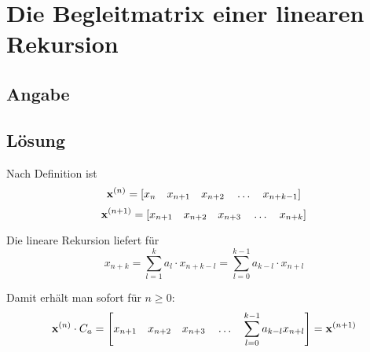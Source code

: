 \section*{Die Begleitmatrix einer linearen Rekursion}
\subsection*{Angabe}


\subsection*{Lösung}
\begin{flushenum}

\item
	Nach Definition ist
	\[ {\bf x}^{(n)} = \left[ x_n \quad x_{n+1} \quad x_{n+2} \quad \ldots \quad x_{n+k-1} \right] \]
	\[ {\bf x}^{(n+1)} =  \left[ x_{n+1} \quad x_{n+2} \quad x_{n+3} \quad \ldots \quad x_{n+k} \right] \]

	Die lineare Rekursion liefert für 
	\[ x_{n+k} = \sum_{l = 1}^{k} a_l \cdot x_{n+k-l} = \sum_{l=0}^{k-1} a_{k-l} \cdot x_{n+l} \]

	Damit erhält man sofort für $n \geq 0$:
	\[ {\bf x}^{(n)} \cdot C_a = \left[  x_{n+1} \quad x_{n+2} \quad
	x_{n+3} \quad \ldots \quad \sum_{l=0}^{k-1} a_{k-l} x_{n+l} \right] =
	{\bf x}^{(n+1)} \]


\end{flushenum}
